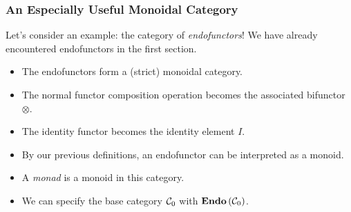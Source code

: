 \documentclass{beamer}
\numberwithin{figure}{section}
\newcommand{\arbcat}[1]{\ensuremath\mathcal{#1}}
\DeclareMathOperator{\catendo}{\text{\textbf{Endo}}}
\begin{document}
\begin{frame}
        \frametitle{An Especially Useful Monoidal Category}
        Let's consider an example: the category of \textit{endofunctors}! We
        have already encountered endofunctors in the first section.
        \begin{itemize}
                \item The endofunctors form a (strict) monoidal category.
                \item The normal functor composition operation becomes the
                        associated bifunctor $\otimes$.
                \item The identity functor becomes the identity element $I$.
                \item By our previous definitions, an endofunctor can be
                        interpreted as a monoid.
                \item A \textit{monad} is a monoid in this category.
                \item We can specify the base category $\arbcat{C}_0$ with
                        $\catendo{(\arbcat{C}_0)}$.
        \end{itemize}
\end{frame}
\end{document}
